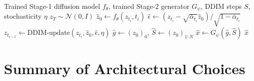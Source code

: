 \documentclass[12pt]{article}
\begin{document}
\begin{algorithm}[t]
\caption{Two-stage sampling procedure}
\label{alg:sampling}
\begin{algorithmic}[1]
\REQUIRE Trained Stage-1 diffusion model $f_\theta$, trained Stage-2
generator $G_\psi$, DDIM steps $S$, stochasticity $\eta$
\STATE $z_T \sim \mathcal{N}(0, I)$ \hfill{}
    \STATE $\hat{z}_0 \leftarrow f_\theta(z_{t_i}, t_i)$ \hfill{}
    \STATE $\hat{\epsilon} \leftarrow (z_{t_i} - \sqrt{\bar{\alpha}_{t_i}}\hat{z}_0) / \sqrt{1 - \bar{\alpha}_{t_i}}$ \hfill{}
    \STATE $z_{t_{i-1}} \leftarrow \text{DDIM-update}(z_{t_i}, \hat{z}_0, \hat{\epsilon}, \eta)$ \hfill{}
\ENDFOR
\STATE $\hat{g} \leftarrow (z_0)_0$, \quad $\hat{S} \leftarrow (z_0)_{1:N}$ \hfill{}
\STATE $\hat{x} \leftarrow G_\psi(\hat{g}, \hat{S})$ \hfill{}
\RETURN $\hat{x}$
\end{algorithmic}
\end{algorithm}

\section{Summary of Architectural Choices}
\label{sec:summary}
\end{document}
